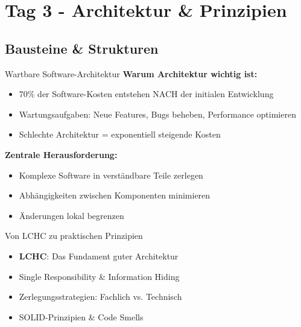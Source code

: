 \section{Tag 3 - Architektur \& Prinzipien}


\subsection{Bausteine \& Strukturen}

\begin{frame}{Wartbare Software-Architektur}
  \textbf{Warum Architektur wichtig ist:}
  \begin{itemize}
    \item 70\% der Software-Kosten entstehen NACH der initialen Entwicklung
    \item Wartungsaufgaben: Neue Features, Bugs beheben, Performance optimieren
    \item Schlechte Architektur = exponentiell steigende Kosten
  \end{itemize}

  \textbf{Zentrale Herausforderung:}
  \begin{itemize}
    \item Komplexe Software in verständbare Teile zerlegen
    \item Abhängigkeiten zwischen Komponenten minimieren
    \item Änderungen lokal begrenzen
  \end{itemize}

  \begin{exampleblock}{Von LCHC zu praktischen Prinzipien}
    \begin{itemize}
      \item \textbf{LCHC}: Das Fundament guter Architektur
      \item Single Responsibility \& Information Hiding
      \item Zerlegungsstrategien: Fachlich vs. Technisch
      \item SOLID-Prinzipien \& Code Smells
    \end{itemize}
  \end{exampleblock}
\end{frame}

